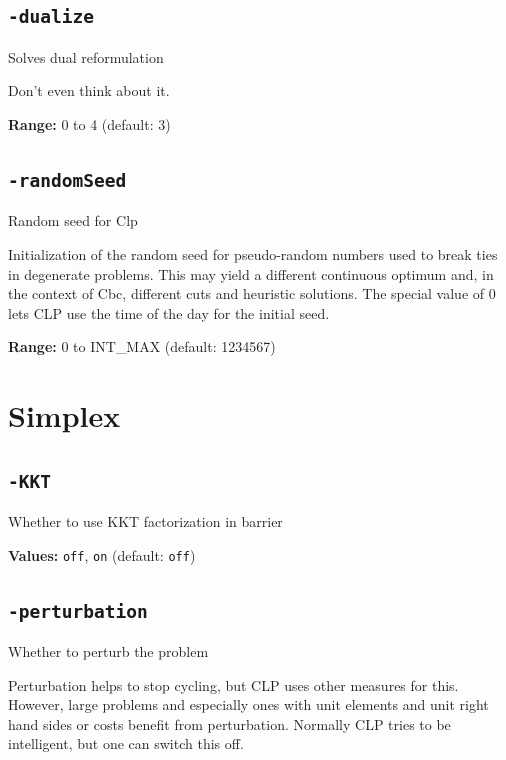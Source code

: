\documentclass[11pt,a4paper]{article}
\begin{document}
\subsection*{\texttt{-dualize}}

Solves dual reformulation

Don't even think about it.

\textbf{Range:} 0 to 4 (default: 3)

\subsection*{\texttt{-randomSeed}}

Random seed for Clp

Initialization of the random seed for pseudo-random numbers used to break ties in degenerate problems. This may yield a different continuous optimum and, in the context of Cbc, different cuts and heuristic solutions. The special value of 0 lets CLP use the time of the day for the initial seed.

\textbf{Range:} 0 to INT\_MAX (default: 1234567)

\section{Simplex}

\subsection*{\texttt{-KKT}}

Whether to use KKT factorization in barrier

\textbf{Values:} \texttt{off}, \texttt{on} (default: \texttt{off})

\subsection*{\texttt{-perturbation}}

Whether to perturb the problem

Perturbation helps to stop cycling, but CLP uses other measures for this. However, large problems and especially ones with unit elements and unit right hand sides or costs benefit from perturbation.  Normally CLP tries to be intelligent, but one can switch this off.
\end{document}
